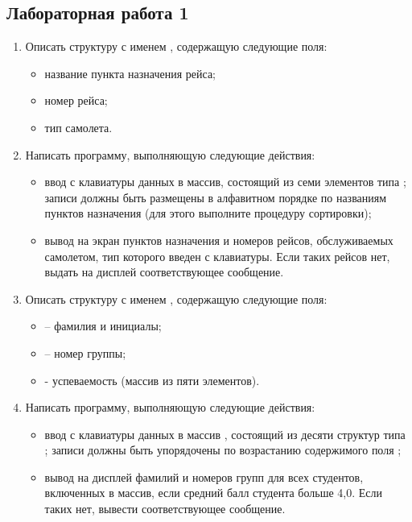 \subsection{Лабораторная работа 1}
\begin{enumerate}[leftmargin=*]
    \item Описать структуру с именем , содержащую следующие поля:
        \begin{itemize}
            \item название пункта назначения рейса;
            \item номер рейса;
            \item тип самолета.
        \end{itemize}
    \item Написать программу, выполняющую следующие действия:
        \begin{itemize}
            \item ввод с клавиатуры данных в массив, состоящий из семи элементов типа ; записи должны быть размещены в алфавитном порядке по названиям пунктов назначения (для этого выполните процедуру сортировки);
            \item вывод на экран пунктов назначения и номеров рейсов, обслуживаемых самолетом, тип которого введен с клавиатуры. Если таких рейсов нет, выдать на дисплей соответствующее сообщение.
        \end{itemize}
    \item Описать структуру с именем , содержащую следующие поля:
        \begin{itemize}
            \item {} – фамилия и инициалы;
            \item {} – номер группы;
            \item {} - успеваемость (массив из пяти элементов).
        \end{itemize}
    \item Написать программу, выполняющую следующие действия:
        \begin{itemize}
            \item ввод с клавиатуры данных в массив , состоящий из десяти структур типа ; записи должны быть упорядочены по возрастанию содержимого поля ;
            \item вывод на дисплей фамилий и номеров групп для всех студентов, включенных в массив, если средний балл студента больше 4,0. Если таких нет, вывести соответствующее сообщение.
        \end{itemize}
\end{enumerate}

